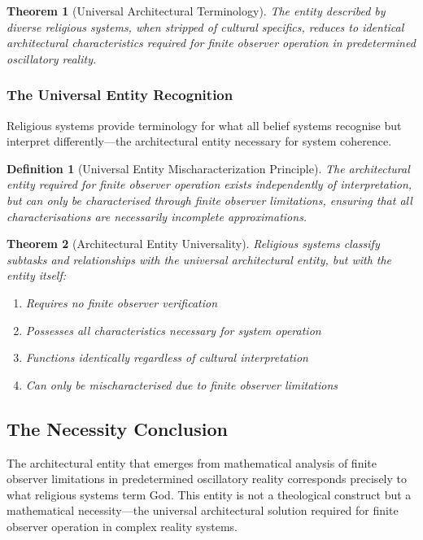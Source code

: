 \documentclass[12pt,a4paper]{article}
\newtheorem{theorem}{Theorem}
\newtheorem{definition}{Definition}
\begin{document}
\begin{theorem}[Universal Architectural Terminology]
The entity described by diverse religious systems, when stripped of cultural specifics, reduces to identical architectural characteristics required for finite observer operation in predetermined oscillatory reality.
\end{theorem}

\subsubsection{The Universal Entity Recognition}

Religious systems provide terminology for what all belief systems recognise but interpret differently—the architectural entity necessary for system coherence.

\begin{definition}[Universal Entity Mischaracterization Principle]
The architectural entity required for finite observer operation exists independently of interpretation, but can only be characterised through finite observer limitations, ensuring that all characterisations are necessarily incomplete approximations.
\end{definition}

\begin{theorem}[Architectural Entity Universality]
Religious systems classify subtasks and relationships with the universal architectural entity, but with the entity itself:
\begin{enumerate}
\item Requires no finite observer verification
\item Possesses all characteristics necessary for system operation
\item Functions identically regardless of cultural interpretation
\item Can only be mischaracterised due to finite observer limitations
\end{enumerate}
\end{theorem}

\subsection{The Necessity Conclusion}

The architectural entity that emerges from mathematical analysis of finite observer limitations in predetermined oscillatory reality corresponds precisely to what religious systems term God. This entity is not a theological construct but a mathematical necessity—the universal architectural solution required for finite observer operation in complex reality systems.
\end{document}
